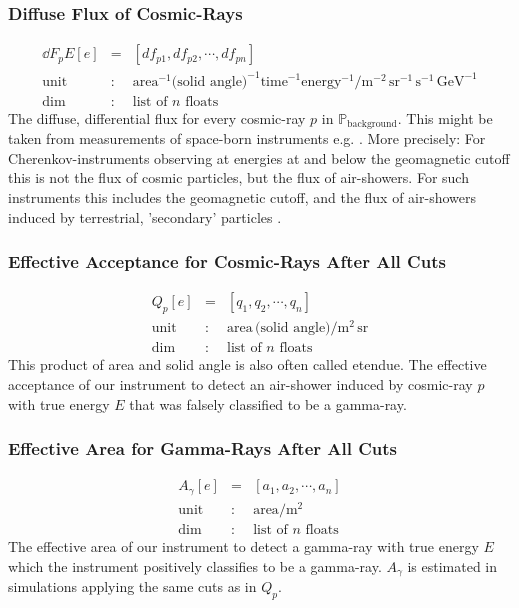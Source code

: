 \documentclass{article}%
\begin{document}
\subsubsection*{Diffuse Flux of Cosmic-Rays}
%
\begin{eqnarray*}
\dd{F_p}{E}[e] &=& [df_{p1}, df_{p2}, \cdots, df_{pn}]\\
\text{unit} &:& \text{area}^{-1} \text{(solid angle)}^{-1} \text{time}^{-1} \text{energy}^{-1} / \text{m}^{-2}\, \text{sr}^{-1}\,\text{s}^{-1}\,\text{GeV}^{-1}\\
\text{dim} &:& \text{list of}\,\,n\,\,\text{floats}
\end{eqnarray*}
%
The diffuse, differential flux for every cosmic-ray $p$ in $\mathbb{P}_\text{background}$. This might be taken from measurements of space-born instruments e.g. \cite{aguilar2014precision,aguilar2015precision}.
%
More precisely: For Cherenkov-instruments observing at energies at and below the geomagnetic cutoff this is not the flux of cosmic particles, but the flux of air-showers.
%
For such instruments this includes the geomagnetic cutoff, and the flux of air-showers induced by terrestrial, 'secondary' particles \cite{lipari2002fluxes}.
%
\subsubsection*{Effective Acceptance for Cosmic-Rays After All Cuts}
\begin{eqnarray*}
Q_p[e] &=& [q_1, q_2, \cdots, q_n]\\
\text{unit} &:& \text{area} \, \text{(solid angle)} / \text{m}^{2}\,\text{sr}\\
\text{dim} &:& \text{list of}\,\,n\,\,\text{floats}
\end{eqnarray*}
%
This product of area and solid angle is also often called etendue.
%
The effective acceptance of our instrument to detect an air-shower induced by cosmic-ray $p$ with true energy $E$ that was falsely classified to be a gamma-ray.
%
\subsubsection*{Effective Area for Gamma-Rays After All Cuts}
\begin{eqnarray*}
A_\gamma[e] &=& [a_1, a_2, \cdots, a_n]\\
\text{unit} &:& \text{area} / \text{m}^{2}\\
\text{dim} &:& \text{list of}\,\,n\,\,\text{floats}
\end{eqnarray*}
%
The effective area of our instrument to detect a gamma-ray with true energy $E$ which the instrument positively classifies to be a gamma-ray.
%
$A_\gamma$ is estimated in simulations applying the same cuts as in $Q_p$.
%
\end{document}
